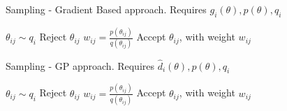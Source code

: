 \begin{minipage}{0.46\textwidth}
\begin{algorithm}[H]
    \centering
    \caption{Sampling - Gradient Based approach. Requires $g_i(\theta), p(\theta), q_i$}\label{alg:sampling_GB}
    \begin{algorithmic}[1]
          \State $\theta_{ij} \sim q_i$
            \State Reject $\theta_{ij}$
          \Else {}
            \State $w_{ij} = \frac{p(\theta_{ij})}{q(\theta_{ij})}$
            \State Accept $\theta_{ij}$, with weight $w_{ij}$
          \EndIf
      \EndFor
      \EndFor
    \end{algorithmic}
\end{algorithm}
\end{minipage}
\hfill
\begin{minipage}{0.46\textwidth}
\begin{algorithm}[H]
    \centering
    \caption{Sampling - GP approach. Requires $\hat{d}_i(\theta), p(\theta), q_i$}\label{alg:sampling_GP}
    \begin{algorithmic}[1]
          \State $\theta_{ij} \sim q_i$
            \State Reject $\theta_{ij}$
          \Else {}
            \State $w_{ij} = \frac{p(\theta_{ij})}{q(\theta_{ij})}$
            \State Accept $\theta_{ij}$, with weight $w_{ij}$
          \EndIf
      \EndFor
      \EndFor
    \end{algorithmic}
\end{algorithm}
\end{minipage}
